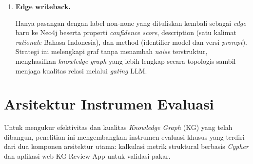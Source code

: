 \documentclass[../../thesis]{subfiles}
\begin{document}
\begin{enumerate}
  \item \textbf{Edge writeback.}

  Hanya pasangan dengan label non-none yang dituliskan kembali sebagai \textit{edge}
  baru ke Neo4j beserta properti \textit{confidence score}, description (satu kalimat
  \textit{rationale} Bahasa Indonesia), dan method (identifier model dan versi
  \textit{prompt}). Strategi ini melengkapi graf tanpa menambah \textit{noise} terstruktur,
  menghasilkan \textit{knowledge graph} yang lebih lengkap secara topologis sambil
  menjaga kualitas relasi melalui \textit{gating} LLM.
\end{enumerate}

\section{Arsitektur Instrumen Evaluasi}\label{sec:instrumen-evaluasi}

Untuk mengukur efektivitas dan kualitas \textit{Knowledge Graph} (KG) yang telah
dibangun, penelitian ini mengembangkan instrumen evaluasi khusus yang
terdiri dari dua komponen arsitektur utama: kalkulasi metrik struktural
berbasis \textit{Cypher} dan aplikasi web KG Review App untuk validasi pakar.
\end{document}
